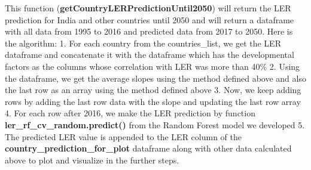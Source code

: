 \documentclass[11pt]{article}
\begin{document}
    

    This function (\textbf{getCountryLERPredictionUntil2050}) will return
the LER prediction for India and other countries until 2050 and will
return a dataframe with all data from 1995 to 2016 and predicted data
from 2017 to 2050. Here is the algorithm: 1. For each country from the
countries\_list, we get the LER dataframe and concatenate it with the
dataframe which has the developmental factors as the columns whose
correlation with LER was more than 40\% 2. Using the dataframe, we get
the average slopes using the method defined above and also the last row
as an array using the method defined above 3. Now, we keep adding rows
by adding the last row data with the slope and updating the last row
array 4. For each row after 2016, we make the LER prediction by function
\textbf{ler\_rf\_cv\_random.predict()} from the Random Forest model we
developed 5. The predicted LER value is appended to the LER column of
the \textbf{country\_prediction\_for\_plot} dataframe along with other
data calculated above to plot and visualize in the further steps.
\end{document}
